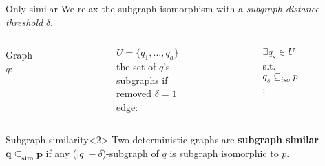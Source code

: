 \documentclass[10pt, aspectratio=149]{beamer}
\begin{document}
\begin{frame}{Only similar}
   We relax the subgraph isomorphism with a \textit{subgraph distance threshold} $\delta$.

\vspace{0.3cm}
 \begin{columns}[T]
    \centering
  Graph $q$: \\ 
  \begin{figure} 
  \centering
  \end{figure}
  
  $U = \{q_1, \ldots, q_a\}$ the set of $q$'s subgraphs if removed $\delta = 1$ edge:  \\ 
   \begin{figure} 
  \centering
  \end{figure}
  
  $\exists q_s \in U$ s.t. $q_s \subseteq_{iso} p$:
   \begin{figure} 
  \centering
  \end{figure}
  \end{columns}
  
  \vspace{0.3cm}
  \begin{block}{Subgraph similarity}<2>
  Two deterministic graphs are \textbf{subgraph similar} $\mathbf{q \subseteq_{sim} p}$ if any ($|q| - \delta$)-subgraph of $q$ is subgraph isomorphic to $p$.
  \end{block}
\end{frame}
\end{document}
